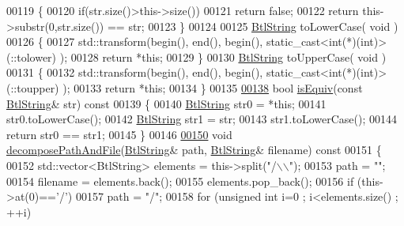 \begin{DoxyCode}
00119 \textcolor{keyword}{    }\{
00120         \textcolor{keywordflow}{if}(str.size()>this->size())
00121             \textcolor{keywordflow}{return} \textcolor{keyword}{false};
00122         \textcolor{keywordflow}{return} this->substr(0,str.size()) == str;
00123     \}
00124 
00125     \hyperlink{class_btl_string}{BtlString} toLowerCase( \textcolor{keywordtype}{void} )
00126     \{
00127         std::transform(begin(), end(), begin(), \textcolor{keyword}{static\_cast<}\textcolor{keywordtype}{int}(*)(\textcolor{keywordtype}{int})\textcolor{keyword}{>}(::tolower) );
00128         \textcolor{keywordflow}{return} *\textcolor{keyword}{this};
00129     \}
00130     \hyperlink{class_btl_string}{BtlString} toUpperCase( \textcolor{keywordtype}{void} )
00131     \{
00132         std::transform(begin(), end(), begin(), \textcolor{keyword}{static\_cast<}\textcolor{keywordtype}{int}(*)(\textcolor{keywordtype}{int})\textcolor{keyword}{>}(::toupper) );
00133         \textcolor{keywordflow}{return} *\textcolor{keyword}{this};
00134     \}
00135 
\hyperlink{class_btl_string_afdc2da5f185fa7585b1363b2dd6b36cb}{00138}     \textcolor{keywordtype}{bool} \hyperlink{class_btl_string_afdc2da5f185fa7585b1363b2dd6b36cb}{isEquiv}(\textcolor{keyword}{const} \hyperlink{class_btl_string}{BtlString}& str)\textcolor{keyword}{ const}
00139 \textcolor{keyword}{    }\{
00140         \hyperlink{class_btl_string}{BtlString} str0 = *\textcolor{keyword}{this};
00141         str0.toLowerCase();
00142         \hyperlink{class_btl_string}{BtlString} str1 = str;
00143         str1.toLowerCase();
00144         \textcolor{keywordflow}{return} str0 == str1;
00145     \}
00146 
\hyperlink{class_btl_string_a111377f6625fffeed8f02992fd164730}{00150}     \textcolor{keywordtype}{void} \hyperlink{class_btl_string_a111377f6625fffeed8f02992fd164730}{decomposePathAndFile}(\hyperlink{class_btl_string}{BtlString}& path, 
      \hyperlink{class_btl_string}{BtlString}& filename)\textcolor{keyword}{ const}
00151 \textcolor{keyword}{    }\{
00152         std::vector<BtlString> elements = this->split(\textcolor{stringliteral}{"/\(\backslash\)\(\backslash\)"});
00153         path = \textcolor{stringliteral}{""};
00154         filename = elements.back();
00155         elements.pop\_back();
00156         \textcolor{keywordflow}{if} (this->at(0)==\textcolor{charliteral}{'/'})
00157             path = \textcolor{stringliteral}{"/"};
00158         \textcolor{keywordflow}{for} (\textcolor{keywordtype}{unsigned} \textcolor{keywordtype}{int} i=0 ; i<elements.size() ; ++i)

\end{DoxyCode}

